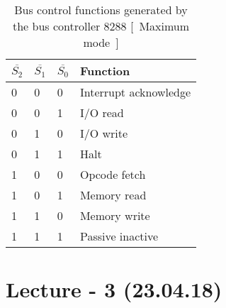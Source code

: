 \documentclass{article}
\begin{document}
\begin{table}[h!]
\centering
\begin{tabular}{ |p{1cm}|p{1cm}|p{1cm}|p{3cm}|  }
\hline
$ \overline{S_2} $ & $ \overline{S_1} $ & $ \overline{S_0} $ & Function   \\
\hline
0 & 0 & 0 & Interrupt acknowledge \\
0 & 0 & 1 & I/O read \\
0 & 1 & 0 & I/O write \\
0 & 1 & 1 & Halt \\
1 & 0 & 0 & Opcode fetch \\
1 & 0 & 1 & Memory read \\
1 & 1 & 0 & Memory write \\
1 & 1 & 1 & Passive inactive \\
\hline
\end{tabular}

\caption{Bus control functions generated by the bus controller 8288 [~Maximum mode~]}
\label{table:2}
\end{table}

\section{Lecture - 3 (23.04.18)}
\end{document}
